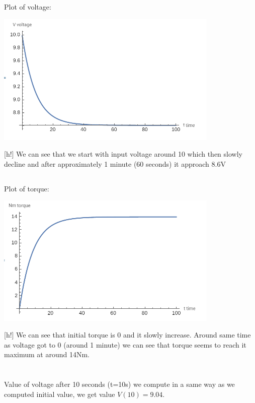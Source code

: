 \documentclass[a4paper]{article}
\begin{document}
	\subsection{}
	Plot of voltage:
	\\
	\centerline{\includegraphics[width=0.8\textwidth]{1_b_v}}[h!]
	We can see that we start with input voltage around 10 which then slowly decline and after approximately 1 minute (60 seconds) it approach 8.6V
	
	\subsection{}
	Plot of torque:
	\\
	\centerline{\includegraphics[width=0.8\textwidth]{1_c_t}}[h!]
	We can see that initial torque is 0 and it slowly increase. Around same time as voltage got to 0 (around 1 minute) we can see that torque seems to reach it maximum at around 14Nm.
	
	\section{}
	\subsection{}
	Value of voltage after 10 seconds (t=10s) we compute in a same way as we computed initial value, we get value $V(10)=9.04$.
	
\end{document}
